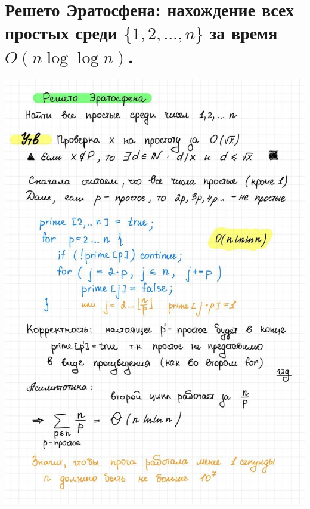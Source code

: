 \section{Решето Эратосфена: нахождение всех простых среди $\{1, 2, \ldots, n\}$ за время $O(n\log{\log{n}})$.}
\includegraphics[width=1\linewidth]{images/Sieve.jpg}

